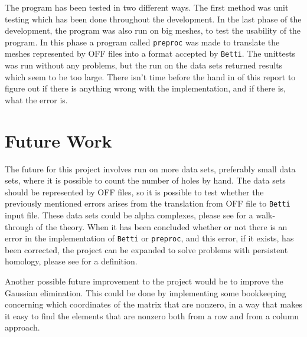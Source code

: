 \documentclass[11pt,a4paper,twoside]{report}
\begin{document}
The program has been tested in two different ways. The first method was unit testing which has been done throughout the development. In the last phase of the development, the program was also run on big meshes, to test the usability of the program. In this phase a program called \texttt{preproc} was made to translate the meshes represented by OFF files into a format accepted by \texttt{Betti}. The unittests was run without any problems, but the run on the data sets returned results which seem to be too large. There isn't time before the hand in of this report to figure out if there is anything wrong with the implementation, and if there is, what the error is.

\section{Future Work}
The future for this project involves run on more data sets, preferably small data sets, where it is possible to count the number of holes by hand. The data sets should be represented by OFF files, so it is possible to test whether the previously mentioned errors arises from the translation from OFF file to \texttt{Betti} input file. These data sets could be alpha complexes, please see \cite{Edelsbrunner} for a walk-through of the theory. When it has been concluded whether or not there is an error in the implementation of \texttt{Betti} or \texttt{preproc}, and this error, if it exists, has been corrected, the project can be expanded to solve problems with persistent homology, please see \cite{Edelsbrunner} for a definition. 

Another possible future improvement to the project would be to improve the Gaussian elimination. This could be done by implementing some bookkeeping concerning which coordinates of the matrix that are nonzero, in a way that makes it easy to find the elements that are nonzero both from a row and from a column approach.
\end{document}
